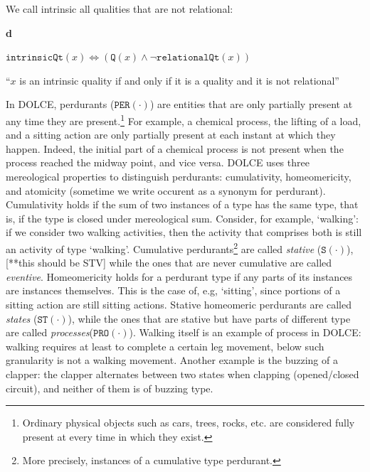 \documentclass[sw]{iosart2x}
\newcommand{\bflist}{\begin{list}{}{\setlength{\topsep}{2mm}\setlength{\partopsep}{0mm}\setlength{\parsep}{0mm}\setlength{\leftmargin}{9mm}\setlength{\labelwidth}{8mm}}}
\newcommand{\eflist}{\end{list}}
\newcommand{\DefLabel}{\textrm{d}}
\newcounter{cntdef}
\newcommand{\mydf}[1]{\refstepcounter{cntdef}\begin{small}{\bf \DefLabel\thecntdef\label{def:#1}}\end{small}}
\newcommand{\mytext}[1]{``#1''}
\newcommand{\generalStyle}[1]{\texttt{#1}}
\newcommand{\uniRel}[2]{\generalStyle{#1}(#2)}
\newcommand{\myiff}{\Longleftrightarrow}
\newcommand{\DOLCE}{\textsc{DOLCE}\xspace} %
\newcommand{\DOLCEQuality}[1]{\uniRel{Q}{#1}}
\newcommand{\DOLCEState}[1]{\uniRel{{ST}}{#1}}
\newcommand{\DOLCEProcess}[1]{\uniRel{PRO}{#1}}
\newcommand{\DOLCEPerdurant}[1]{\uniRel{{PER}}{#1}}
\newcommand{\DOLCEStative}[1]{\uniRel{{S}}{#1}}
\newcommand{\RelationalQuality}[1]{\uniRel{relationalQt}{#1}}
\newcommand{\IntrinsicQuality}[1]{\uniRel{intrinsicQt}{#1}}
\newcommand{\firstTimeKeyWord}[1]{\textit{#1}}
\newcommand{\quotes}[1]{`#1'}
\newcommand{\TODO}[1]{{\color{red} #1}}
\begin{document}
We call intrinsic all qualities that are not relational:
\bflist
  \item[\mydf{intrinsicQtPartialDef}] $ \IntrinsicQuality{x} \myiff  ( \DOLCEQuality{x} \land \neg  \RelationalQuality{x})$
  \item[] \mytext{$x$ is an intrinsic quality if and only if it is a quality and it is not relational}
\eflist

In \DOLCE, perdurants ($\DOLCEPerdurant{\cdot}$) are entities that are only partially present at any time they are present.\footnote{Ordinary physical objects such as cars, trees, rocks, etc. are considered fully present at every time in which they exist.} For example, a chemical process, the lifting of a load, and a sitting action are only partially present at each instant at which they happen. Indeed, the initial part of a chemical process is not present when the process reached the midway point, and vice versa.  %
\DOLCE uses three mereological properties to distinguish perdurants: cumulativity, homeomericity, and atomicity (sometime we write occurent as a synonym for perdurant).
Cumulativity holds if the sum of two instances of a type has the same type, that is, if the type is closed under mereological sum. Consider, for example, \quotes{walking}: if we consider two walking activities, then the activity that comprises both is still an activity of type \quotes{walking}.
Cumulative perdurants\footnote{More precisely, instances of a cumulative type perdurant.} are called \firstTimeKeyWord{stative} ($\DOLCEStative{\cdot}$),\TODO{[**this should be STV]} while the ones that are never cumulative are called \firstTimeKeyWord{eventive}.
Homeomericity holds for a perdurant type if any parts of its instances are instances themselves.
This is the case of, e.g, \quotes{sitting}, since portions of a sitting action are still sitting actions.
Stative homeomeric perdurants are called \firstTimeKeyWord{states} ($\DOLCEState{\cdot}$), while the ones that are stative but have parts of different type are called \firstTimeKeyWord{processes}($\DOLCEProcess{\cdot}$). Walking itself is an example of process in \DOLCE: walking requires at least to complete a certain leg movement, below such granularity is not a walking movement.
Another example is the buzzing of a clapper: the clapper alternates between two states when clapping (opened/closed circuit), and neither of them is of buzzing type.
\end{document}
